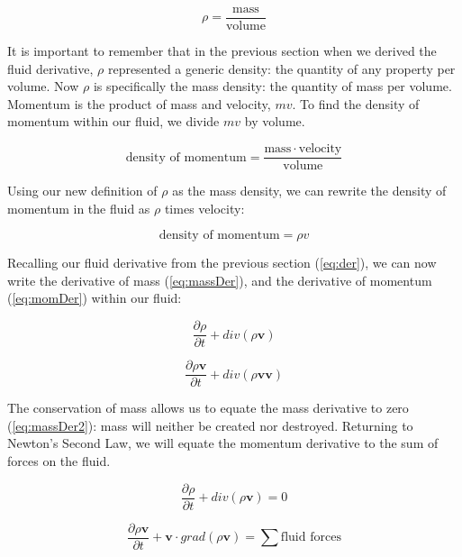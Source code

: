 \documentclass[twocolumn,12pth]{article}
\begin{document}
\begin{equation}
\rho = \frac{\mathrm{mass}}{\mathrm{volume}}
\end{equation}

It is important to remember that in the previous section when we derived the fluid derivative, $\rho$ represented a generic density: the quantity of any property per volume.
Now $\rho$ is specifically the mass density: the quantity of mass per volume.
Momentum is the product of mass and velocity, $mv$.
To find the density of momentum within our fluid, we divide $mv$ by volume.

\begin{equation}
\mathrm{density \,\, of \,\, momentum} = \frac{\mathrm{mass} \cdot \mathrm{velocity}}{\mathrm{volume}}
\end{equation}

Using our new definition of $\rho$ as the mass density, we can rewrite the density of momentum in the fluid as $\rho$ times velocity:

\begin{equation}
\mathrm{density \,\, of \,\, momentum} = \rho{v}
\end{equation}

Recalling our fluid derivative from the previous section (\ref{eq:der}), we can now write the derivative of mass (\ref{eq:massDer}), and the derivative of momentum (\ref{eq:momDer}) within our fluid:

\begin{equation}
\frac{\partial{\rho}}{\partial{t}} + div(\rho \mathbf{v})
\label{eq:massDer}
\end{equation}

\begin{equation}
\frac{\partial{\rho}\mathbf{v}}{\partial{t}} + div(\rho \mathbf{vv})
\label{eq:momDer}
\end{equation}

The conservation of mass allows us to equate the mass derivative to zero (\ref{eq:massDer2}): mass will neither be created nor destroyed. \cite{Ferziger2002}
Returning to Newton's Second Law, we will equate the momentum derivative to the sum of forces on the fluid.

\begin{equation}
\frac{\partial{\rho}}{\partial{t}} + div(\rho \mathbf{v}) = 0
\label{eq:massDer2}
\end{equation}

\begin{equation}
\frac{\partial{\rho}\mathbf{v}}{\partial{t}} + \mathbf{v} \cdot grad(\rho \mathbf{v}) = \sum{\mathrm{fluid \,\, forces}}
\label{eq:momDer2}
\end{equation}
\end{document}
